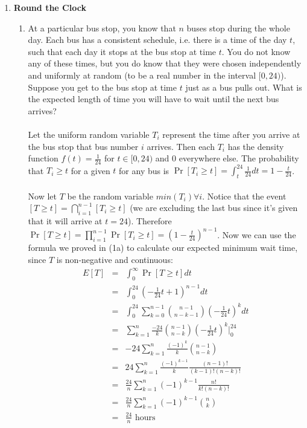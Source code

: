 \documentclass[11pt,fleqn]{article}
\begin{document}
\begin{enumerate}
\newpage
\item \textbf{Round the Clock}
\begin{enumerate}
\item At a particular bus stop, you know that $n$ buses stop during the whole day. Each bus has a consistent schedule, i.e. there is a time of the day $t$, such that each day it stops at the bus stop at time $t$. You do not know any of these times, but you do know that they were chosen independently and uniformly at random (to be a real number in the interval $[0,24)$). Suppose you get to the bus stop at time $t$ just as a bus pulls out. What is the expected length of time you will have to wait until the next bus arrives? \\\\
Let the uniform random variable $T_i$ represent the time after you arrive at the bus stop that bus number $i$ arrives. Then each $T_i$ has the density function $f(t) = \frac1{24}$ for $t \in [0,24)$ and $0$ everywhere else. The probability that $T_i \geq t$ for a given $t$ for any bus is $\Pr[T_i \geq t] = \int_{t}^{24} \frac1{24}dt = 1-\frac t{24}$. \\\\
Now let $T$ be the random variable $min(T_i) \forall i$. Notice that the event $[T\geq t] = \bigcap_{i=1}^{n-1} [T_i \geq t]$ (we are excluding the last bus since it's given that it will arrive at $t=24$). Therefore $\Pr[T\geq t] = \prod_{i=1}^{n-1} \Pr[T_i \geq t] = (1-\frac t{24})^{n-1}$. Now we can use the formula we proved in (1a) to calculate our expected minimum wait time, since $T$ is non-negative and continuous:
\begin{eqnarray*}
E[T] &=& \int_{0}^{\infty} \Pr[T\geq t]dt \\
&=& \int_0^{24} (-\frac1{24}t+1)^{n-1}dt \\
&=& \int_0^{24} \sum_{k=0}^{n-1} \binom{n-1}{n-k-1} (-\frac1{24}t)^k dt \\
&=& \sum_{k=1}^{n} \frac{-24}k \binom{n-1}{n-k} (-\frac1{24}t)^k \bigg|_0^{24} \\
&=& -24 \sum_{k=1}^{n} \frac{(-1)^k}k\binom{n-1}{n-k} \\
&=& 24 \sum_{k=1}^{n} \frac{(-1)^{k-1}}k \frac{(n-1)!}{(k-1)!(n-k)!} \\
&=& \frac{24}n \sum_{k=1}^{n} (-1)^{k-1} \frac{n!}{k!(n-k)!} \\
&=& \frac{24}n \sum_{k=1}^{n} (-1)^{k-1} \binom{n}k \\
&=& \frac{24}n \text{ hours}
\end{eqnarray*}

\end{enumerate}
\end{enumerate}
\end{document}
